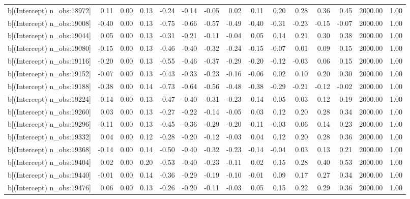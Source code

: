 \begin{table}[ht]
\begin{tabular}{rrrrrrrrrrrrrrr}
  b[(Intercept) n\_obs:18972] & 0.11 & 0.00 & 0.13 & -0.24 & -0.14 & -0.05 & 0.02 & 0.11 & 0.20 & 0.28 & 0.36 & 0.45 & 2000.00 & 1.00 \\ 
  b[(Intercept) n\_obs:19008] & -0.40 & 0.00 & 0.13 & -0.75 & -0.66 & -0.57 & -0.49 & -0.40 & -0.31 & -0.23 & -0.15 & -0.07 & 2000.00 & 1.00 \\ 
  b[(Intercept) n\_obs:19044] & 0.05 & 0.00 & 0.13 & -0.31 & -0.21 & -0.11 & -0.04 & 0.05 & 0.14 & 0.21 & 0.30 & 0.38 & 2000.00 & 1.00 \\ 
  b[(Intercept) n\_obs:19080] & -0.15 & 0.00 & 0.13 & -0.46 & -0.40 & -0.32 & -0.24 & -0.15 & -0.07 & 0.01 & 0.09 & 0.15 & 2000.00 & 1.00 \\ 
  b[(Intercept) n\_obs:19116] & -0.20 & 0.00 & 0.13 & -0.55 & -0.46 & -0.37 & -0.29 & -0.20 & -0.12 & -0.03 & 0.06 & 0.15 & 2000.00 & 1.00 \\ 
  b[(Intercept) n\_obs:19152] & -0.07 & 0.00 & 0.13 & -0.43 & -0.33 & -0.23 & -0.16 & -0.06 & 0.02 & 0.10 & 0.20 & 0.30 & 2000.00 & 1.00 \\ 
  b[(Intercept) n\_obs:19188] & -0.38 & 0.00 & 0.14 & -0.73 & -0.64 & -0.56 & -0.48 & -0.38 & -0.29 & -0.21 & -0.12 & -0.02 & 2000.00 & 1.00 \\ 
  b[(Intercept) n\_obs:19224] & -0.14 & 0.00 & 0.13 & -0.47 & -0.40 & -0.31 & -0.23 & -0.14 & -0.05 & 0.03 & 0.12 & 0.19 & 2000.00 & 1.00 \\ 
  b[(Intercept) n\_obs:19260] & 0.03 & 0.00 & 0.13 & -0.27 & -0.22 & -0.14 & -0.05 & 0.03 & 0.12 & 0.20 & 0.28 & 0.34 & 2000.00 & 1.00 \\ 
  b[(Intercept) n\_obs:19296] & -0.11 & 0.00 & 0.13 & -0.45 & -0.36 & -0.29 & -0.20 & -0.11 & -0.03 & 0.06 & 0.14 & 0.23 & 2000.00 & 1.00 \\ 
  b[(Intercept) n\_obs:19332] & 0.04 & 0.00 & 0.12 & -0.28 & -0.20 & -0.12 & -0.03 & 0.04 & 0.12 & 0.20 & 0.28 & 0.36 & 2000.00 & 1.00 \\ 
  b[(Intercept) n\_obs:19368] & -0.14 & 0.00 & 0.14 & -0.50 & -0.40 & -0.32 & -0.23 & -0.14 & -0.04 & 0.03 & 0.13 & 0.21 & 2000.00 & 1.00 \\ 
  b[(Intercept) n\_obs:19404] & 0.02 & 0.00 & 0.20 & -0.53 & -0.40 & -0.23 & -0.11 & 0.02 & 0.15 & 0.28 & 0.40 & 0.53 & 2000.00 & 1.00 \\ 
  b[(Intercept) n\_obs:19440] & -0.01 & 0.00 & 0.14 & -0.36 & -0.29 & -0.19 & -0.10 & -0.01 & 0.09 & 0.17 & 0.27 & 0.34 & 2000.00 & 1.00 \\ 
  b[(Intercept) n\_obs:19476] & 0.06 & 0.00 & 0.13 & -0.26 & -0.20 & -0.11 & -0.03 & 0.05 & 0.15 & 0.22 & 0.29 & 0.36 & 2000.00 & 1.00 \\ 

\end{tabular}
\end{table}
